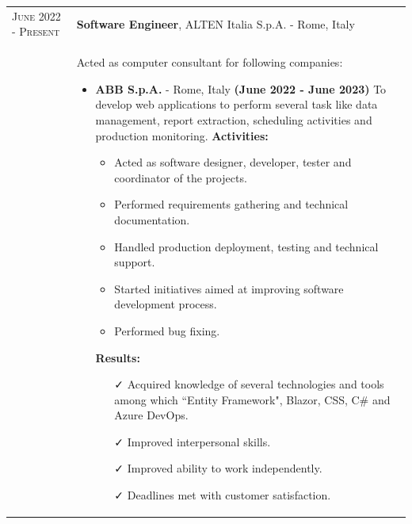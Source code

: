\documentclass[english,10pt,a4paper]{article}
\newcommand{\CvCheck}{\textcolor{CvColor}{\faCheck}}
\newcommand{\CvTimeRange}[2]{\textcolor{CvColor}{\textsc{#1 - #2}}}
\def\SidebarHSizeFirstPage{2.5cm}
\def\BodyHSizeFirstPage{9cm}
\begin{document}
\begin{paracol}{2}
\begin{tcolorbox}[colback=white, height=\textheight,colframe=white, top=0pt,bottom=0pt]
		      \begin{tabular}{p{\SidebarHSizeFirstPage}|p{\BodyHSizeFirstPage}}
		      	\CvTimeRange{June 2022}{Present} & \textbf{Software Engineer}, ALTEN Italia S.p.A. - Rome, Italy \\
		      	& Acted as computer consultant for following companies: 
		      	\begin{itemize}
		      		\item \textbf{ABB S.p.A.} - Rome, Italy \newline
		      		\textbf{(June 2022 - June 2023)} \newline
		      		To develop web applications to perform several task like data management, report extraction, scheduling activities and production monitoring.\newline
		      		\textcolor{CvColor}{\textbf{Activities:}}
		      		\begin{itemize}
		      			\item Acted as software designer, developer, tester and coordinator of the projects.
		      			\item Performed requirements gathering and technical documentation.
		      			\item Handled production deployment, testing and technical support.
		      			\item Started initiatives aimed at improving software development process.
		      			\item Performed bug fixing.
		      		\end{itemize}
		      		\textcolor{CvColor}{\textbf{Results:}}
		      		\begin{itemize}
		      			\item[\CvCheck] Acquired knowledge of several technologies and tools among which ``Entity Framework", Blazor, CSS, C\# and Azure DevOps.
		      			\item[\CvCheck] Improved interpersonal skills.
		      			\item[\CvCheck] Improved ability to work independently.
		      			\item[\CvCheck] Deadlines met with customer satisfaction. 
		      		\end{itemize}
		      	\end{itemize} \\
		      	
		      \end{tabular}
		      
		      
		      
	\end{tcolorbox}
\end{paracol}
\newpage
{}
\end{document}

